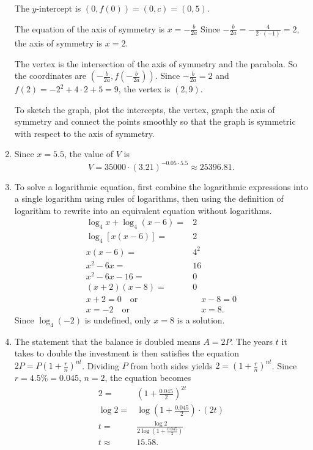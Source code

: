 \documentclass[
  12pt]{article}
\begin{document}
\begin{enumerate}
  The \(y\)-intercept is \((0, f(0))=(0, c)=(0, 5)\).

  The equation of the axis of symmetry is \(x=-\frac{b}{2a}\) Since
  \(-\frac{b}{2a}=-\frac{4}{2\cdot(-1)}=2\), the axis of symmetry is
  \(x=2\).

  The vertex is the intersection of the axis of symmetry and the
  parabola. So the coordinates are
  \(\left(-\frac{b}{2a}, f\left(-\frac{b}{2a}\right)\right)\). Since
  \(-\frac{b}{2a}=2\) and \(f(2)=-2^2+4\cdot 2+5=9\), the vertex is
  \((2, 9)\).

  To sketch the graph, plot the intercepts, the vertex, graph the axis
  of symmetry and connect the points smoothly so that the graph is
  symmetric with respect to the axis of symmetry.
\item
  Since \(x=5.5\), the value of \(V\) is \[
  V=35000\cdot (3.21)^{-0.05\cdot 5.5}\approx 25396.81.
  \]
\item
  To solve a logarithmic equation, first combine the logarithmic
  expressions into a single logarithm using rules of logarithms, then
  using the definition of logarithm to rewrite into an equivalent
  equation without logarithms. \[
  \begin{aligned}
  \log_4x+\log_4(x-6)=&2\\
  \log_4[x(x-6)]=&2\\
  x(x-6)=&4^2\\
  x^2-6x=&16\\
  x^2-6x-16=&0\\
  (x+2)(x-8)=&0\\
  x+2=0\quad\text{or}&\quad x-8=0\\
  x=-2\quad\text{or}&\quad x=8.
  \end{aligned}
  \] Since \(\log_4(-2)\) is undefined, only \(x=8\) is a solution.
\item
  The statement that the balance is doubled means \(A=2P\). The years
  \(t\) it takes to double the investment is then satisfies the equation
  \(2P=P\left(1+\frac{r}{n}\right)^{nt}\). Dividing \(P\) from both
  sides yields \(2=\left(1+\frac{r}{n}\right)^{nt}\). Since
  \(r=4.5\%=0.045\), \(n=2\), the equation becomes \[
  \begin{aligned}
  2=&\left(1+\frac{0.045}{2}\right)^{2t}\\
  \log 2=&\log\left(1+\frac{0.045}{2}\right)\cdot (2t)\\
  t=&\frac{\log 2}{2\log\left(1+\frac{0.045}{2}\right)}\\
  t\approx&15.58.
  \end{aligned}
\]
\end{enumerate}
\end{document}
